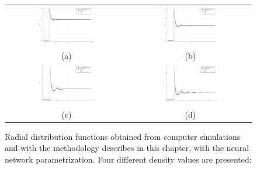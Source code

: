 \begin{figure}[p]
    \begin{tabular}{cc}
        \includegraphics[width=0.47\textwidth]{figuras/capitulo-3/p=0.15.pdf} & 
        \includegraphics[width=0.47\textwidth]{figuras/capitulo-3/p=0.25.pdf} \\
        (a) & (b) \\[6pt]
        \includegraphics[width=0.47\textwidth]{figuras/capitulo-3/p=0.35.pdf} &   \includegraphics[width=0.47\textwidth]{figuras/capitulo-3/p=0.45.pdf} \\
        (c) & (d) \\[6pt]
    \end{tabular}
    \captionsetup{singlelinecheck=off}
    \caption[Radial distribution functions with neural networks.]{Radial distribution functions obtained from computer simulations and with the methodology describes in this chapter, with the neural network parametrization. Four different density values are presented:
}
\end{figure}
